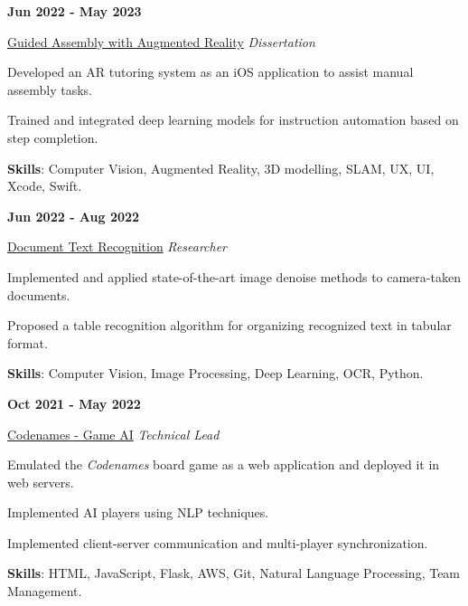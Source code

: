 \documentclass[9pt,a4paper]{article} %
\newenvironment{itemize-noindent}
{
\setlength{\leftmargini}{1em}
\begin{itemize}
\setlength{\itemsep}{0pt}
\setlength{\parskip}{0pt}
}
{\end{itemize}}
\begin{document}
\begin{multicols}{2}

\textbf{Jun 2022 - May 2023}

\href{https://github.com/Stx666Michael/LEGOAssemblyGuideAR}{Guided Assembly with Augmented Reality} \hfill \textit{Dissertation}

\begin{itemize-noindent}
    \item Developed an AR tutoring system as an iOS application to assist manual assembly tasks.
    \item Trained and integrated deep learning models for instruction automation based on step completion.
    \item \textbf{Skills}: Computer Vision, Augmented Reality, 3D modelling, SLAM, UX, UI, Xcode, Swift.
\end{itemize-noindent}
\vspace{2mm}


\textbf{Jun 2022 - Aug 2022}

\href{https://github.com/Stx666Michael/DocumentDenoise}{Document Text Recognition} \hfill \textit{Researcher}

\begin{itemize-noindent}
    \item Implemented and applied state-of-the-art image denoise methods to camera-taken documents.
    \item Proposed a table recognition algorithm for organizing recognized text in tabular format.
    \item \textbf{Skills}: Computer Vision, Image Processing, Deep Learning, OCR, Python.
\end{itemize-noindent}
\vspace{2mm}


\textbf{Oct 2021 - May 2022}

\href{https://github.com/Stx666Michael/Codenames_Multiplayer_AI_Online}{Codenames - Game AI} \hfill \textit{Technical Lead}

\begin{itemize-noindent}
    \item Emulated the \textit{Codenames} board game as a web application and deployed it in web servers.
    \item Implemented AI players using NLP techniques.
    \item Implemented client-server communication and multi-player synchronization.
    \item \textbf{Skills}: HTML, JavaScript, Flask, AWS, Git, Natural Language Processing, Team Management.
\end{itemize-noindent}
\vspace{2mm}


\end{multicols}
\end{document}
